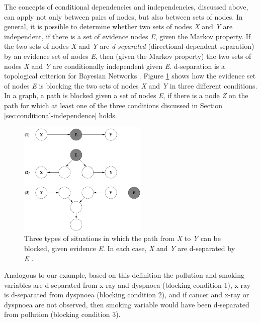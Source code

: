\documentclass[11pt]{article}
\begin{document}
The concepts of conditional dependencies and independencies, discussed above,
can apply not only between pairs of nodes, but also between sets of nodes. In
general, it is possible to determine whether two sets of nodes \textit{X} and
\textit{Y} are independent, if there is a set of evidence nodes \textit{E},
given the Markov property. If the two sets of nodes \textit{X} and \textit{Y}
are \textit{d-separated} (directional-dependent separation) by an evidence set
of nodes \textit{E}, then (given the Markov property) the two sets of nodes
\textit{X} and \textit{Y} are conditionally independent given \textit{E}.
d-separation is a topological criterion for Bayesian Networks
\cite{russell:ai-modern}. Figure \ref{fig:d-separation} shows how the evidence
set of nodes \textit{E} is blocking the two sets of nodes \textit{X} and
\textit{Y} in three different conditions. In a graph, a path is blocked given a
set of nodes \textit{E}, if there is a node \textit{Z} on the path for which at
least one of the three conditions discussed in Section
\ref{sec:conditional-independence} holds.

\begin{figure}[tbh]
  \center
  \includegraphics[width=0.55\textwidth]{figure/d-separation.png}
  \caption{Three types of situations in which the path from \textit{X} to
  \textit{Y} can be blocked, given evidence \textit{E}. In each case, \textit{X}
  and \textit{Y} are d-separated by \textit{E}
  \cite{korb:bayesian-ai}.}
  \label{fig:d-separation}
\end{figure}

Analogous to our example, based on this definition the pollution and smoking
variables are d-separated from x-ray and dyspnoea (blocking condition 1), x-ray
is d-separated from dyspnoea (blocking condition 2), and if cancer and x-ray or
dyspnoea are not observed, then smoking variable would have been d-separated
from pollution (blocking condition 3).
\end{document}
